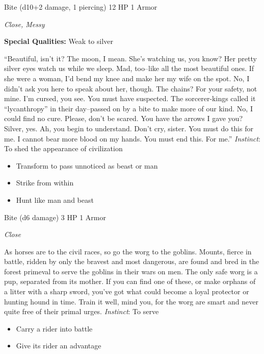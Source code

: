 Bite (d10+2 damage, 1 piercing)\hspace*{\fill} 12 HP 1 Armor

\emph{Close, Messy}

\textbf{Special Qualities:}
Weak to silver

\HRule
``Beautiful, isn't it? The moon, I mean. She's watching us, you know? Her pretty silver eyes watch us while we sleep. Mad, too--like all the most beautiful ones. If she were a woman, I'd bend my knee and make her my wife on the spot. No, I didn't ask you here to speak about her, though. The chains? For your safety, not mine. I'm cursed, you see. You must have suspected. The sorcerer-kings called it ``lycanthropy'' in their day--passed on by a bite to make more of our kind. No, I could find no cure. Please, don't be scared. You have the arrows I gave you? Silver, yes. Ah, you begin to understand. Don't cry, sister. You must do this for me. I cannot bear more blood on my hands. You must end this. For me.'' \emph{Instinct}: To shed the appearance of civilization
\begin{itemize}
\item Transform to pass unnoticed as beast or man
\item Strike from within
\item Hunt like man and beast
\end{itemize}

\HRule
{}

Bite (d6 damage)\hspace*{\fill} 3 HP 1 Armor

\emph{Close}

\HRule
As horses are to the civil races, so go the worg to the goblins. Mounts, fierce in battle, ridden by only the bravest and most dangerous, are found and bred in the forest primeval to serve the goblins in their wars on men. The only safe worg is a pup, separated from its mother. If you can find one of these, or make orphans of a litter with a sharp sword, you've got what could become a loyal protector or hunting hound in time. Train it well, mind you, for the worg are smart and never quite free of their primal urges. \emph{Instinct}: To serve
\begin{itemize}
\item Carry a rider into battle
\item Give its rider an advantage
\end{itemize}
